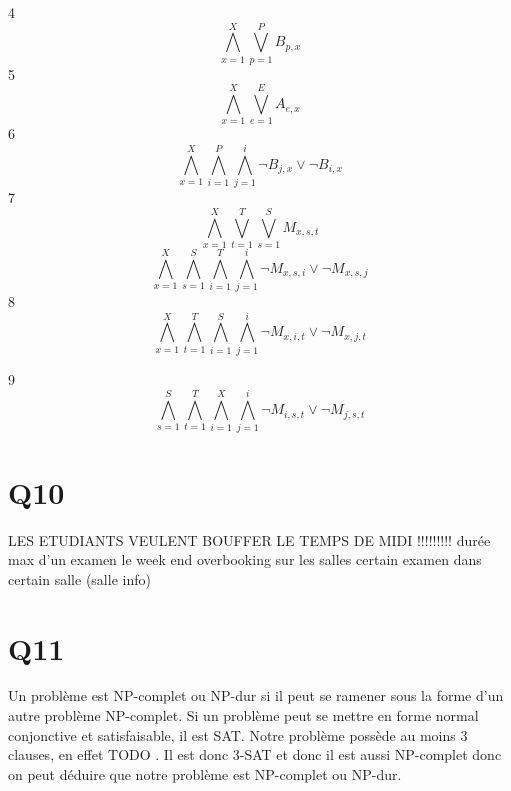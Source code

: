 \documentclass[a4paper,10pt]{article}
\begin{document}
4
\begin{displaymath}
\bigwedge\limits_{x=1}^{X}\bigvee\limits_{p=1}^{P} B_{p, x}
\end{displaymath}
5
\begin{displaymath}
\bigwedge\limits_{x=1}^{X}\bigvee\limits_{e=1}^{E} A_{e, x}
\end{displaymath}
6
\begin{displaymath}
\bigwedge\limits_{x=1}^{X}\bigwedge\limits_{i=1}^{P}\bigwedge\limits_{j=1}^{i} \neg B_{j,x} \vee \neg B_{i, x}
\end{displaymath}
7
\begin{displaymath}
\bigwedge\limits_{x=1}^{X}\bigvee\limits_{t=1}^{T}\bigvee\limits_{s=1}^{S} M_{x, s, t}
\end{displaymath}
\begin{displaymath}
\bigwedge\limits_{x=1}^{X}\bigwedge\limits_{s=1}^{S}\bigwedge\limits_{i=1}^{T}\bigwedge\limits_{j=1}^{i} \neg M_{x, s, i} \vee \neg M_{x, s, j}
\end{displaymath}
8
\begin{displaymath}
\bigwedge\limits_{x=1}^{X}\bigwedge\limits_{t=1}^{T}\bigwedge\limits_{i=1}^{S}\bigwedge\limits_{j=1}^{i} \neg M_{x, i, t} \vee \neg M_{x, j, t}
\end{displaymath}

9
\begin{displaymath}
\bigwedge\limits_{s=1}^{S}\bigwedge\limits_{t=1}^{T}\bigwedge\limits_{i=1}^{X}\bigwedge\limits_{j=1}^{i} \neg M_{i, s, t} \vee \neg M_{j, s, t}
\end{displaymath}

\section{Q10}

LES ETUDIANTS VEULENT BOUFFER LE TEMPS DE MIDI !!!!!!!!!
durée max d'un examen
le week end
overbooking sur les salles
certain examen dans certain salle (salle info)


\section{Q11}
Un problème est NP-complet ou NP-dur si il peut se ramener sous la forme d'un autre problème NP-complet. Si un problème peut se mettre en forme normal conjonctive et satisfaisable, il est SAT. Notre problème possède au moins 3 clauses, en effet TODO . Il est donc 3-SAT et donc il est aussi NP-complet donc on peut déduire que notre problème est NP-complet ou NP-dur.
\end{document}
